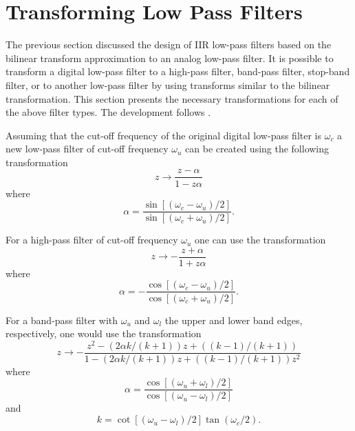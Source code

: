 \section{Transforming Low Pass Filters}
\label{s4.5}

	The previous section discussed the design of IIR low-pass
filters based on the bilinear transform approximation to an analog low-pass
filter.  It is possible to transform a digital low-pass filter
to a high-pass filter, band-pass filter, stop-band filter, or to
another low-pass filter by using transforms similar to the bilinear
transformation.  This section presents the necessary transformations
for each of the above filter types.  The development follows \cite{rabiner}.

	Assuming that the cut-off frequency of the original digital
low-pass filter is $\omega_c$ a new low-pass filter of cut-off
frequency $\omega_u$ can be created using the following transformation
%
\begin{equation}
z\rightarrow\frac{z-\alpha}{1-z\alpha}
\label{e.iir.a}
\end{equation}
%
where
%
\begin{equation}
\alpha=\frac{\sin[(\omega_c-\omega_u)/2]}{\sin[(\omega_c+\omega_u)/2]}.
\label{e.iir.b}
\end{equation}
%

	For a high-pass filter of cut-off frequency $\omega_u$ one can use
the transformation
%
\begin{equation}
z\rightarrow-\frac{z+\alpha}{1+z\alpha}
\label{e.iir.c}
\end{equation}
%
where
%
\begin{equation}
\alpha=-\frac{\cos[(\omega_c-\omega_u)/2]}{\cos[(\omega_c+\omega_u)/2]}.
\label{e.iir.d}
\end{equation}
%

	For a band-pass filter with $\omega_u$ and $\omega_l$
the upper and lower band edges, respectively, one would use the transformation
%
\begin{equation}
z\rightarrow-\frac{z^2-(2\alpha k/(k+1))z+((k-1)/(k+1))}{1-(2\alpha k/(k+1))z+((k-1)/(k+1))z^2}
\label{e.iir.e}
\end{equation}
%
where
%
\begin{equation}
\alpha=\frac{\cos[(\omega_u+\omega_l)/2]}{\cos[(\omega_u-\omega_l)/2]}
\label{e.iir.f}
\end{equation}
%
and
%
\begin{equation}
k=\cot[(\omega_u-\omega_l)/2]\tan(\omega_c/2).
\label{e.iir.g}
\end{equation}
%

